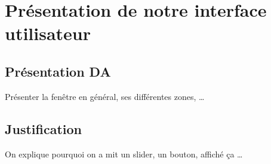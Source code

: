 \section{Présentation de notre interface utilisateur}

\subsection{Présentation DA}
Présenter la fenêtre en général, ses différentes zones, \dots

\subsection{Justification}
On explique pourquoi on a mit un slider, un bouton, affiché ça \dots